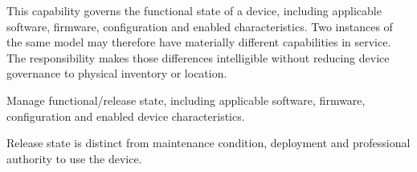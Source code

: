 This capability governs the functional state of a device, including applicable software, firmware, configuration and enabled characteristics. Two instances of the same model may therefore have materially different capabilities in service. The responsibility makes those differences intelligible without reducing device governance to physical inventory or location.



Manage functional/\allowbreak{}release state, including applicable software, firmware, configuration and enabled device characteristics.



Release state is distinct from maintenance condition, deployment and professional authority to use the device.


